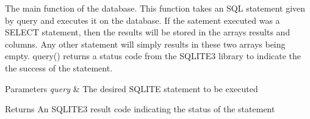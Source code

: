 The main function of the database. This function takes an S\-Q\-L statement given by query and executes it on the database. If the satement executed was a S\-E\-L\-E\-C\-T statement, then the results will be stored in the arrays results and columns. Any other statement will simply results in these two arrays being empty. query() returns a status code from the S\-Q\-L\-I\-T\-E3 library to indicate the the success of the statement. 
\begin{DoxyParams}{Parameters}
{\em query} & The desired S\-Q\-L\-I\-T\-E statement to be executed \\
\hline
\end{DoxyParams}
\begin{DoxyReturn}{Returns}
An S\-Q\-L\-I\-T\-E3 result code indicating the status of the statement 
\end{DoxyReturn}


